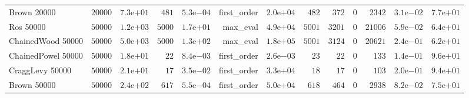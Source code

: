 \begin{longtable}[c]{lrrrrrrrrrrrr}
Brown 20000 & \(20000\) & \( 7.3\)e\(+01\) & \(  481\) & \( 5.3\)e\(-04\) & first\_order & \( 2.0\)e\(+04\) & \(  482\) & \(  372\) & \(    0\) & \( 2342\) & \( 3.1\)e\(-02\) & \( 7.7\)e\(+01\) \\
Ros 50000 & \(50000\) & \( 1.2\)e\(+03\) & \( 5000\) & \( 1.7\)e\(+01\) & max\_eval & \( 4.9\)e\(+04\) & \( 5001\) & \( 3201\) & \(    0\) & \(21006\) & \( 5.9\)e\(-02\) & \( 6.4\)e\(+01\) \\
ChainedWood 50000 & \(50000\) & \( 5.0\)e\(+03\) & \( 5000\) & \( 1.3\)e\(+02\) & max\_eval & \( 1.8\)e\(+05\) & \( 5001\) & \( 3124\) & \(    0\) & \(20621\) & \( 2.4\)e\(-01\) & \( 6.2\)e\(+01\) \\
ChainedPowel 50000 & \(50000\) & \( 1.8\)e\(+01\) & \(   22\) & \( 8.4\)e\(-03\) & first\_order & \( 2.6\)e\(-03\) & \(   23\) & \(   22\) & \(    0\) & \(  133\) & \( 1.4\)e\(-01\) & \( 9.6\)e\(+01\) \\
CraggLevy 50000 & \(50000\) & \( 2.1\)e\(+01\) & \(   17\) & \( 3.5\)e\(-02\) & first\_order & \( 3.3\)e\(+04\) & \(   18\) & \(   17\) & \(    0\) & \(  103\) & \( 2.0\)e\(-01\) & \( 9.4\)e\(+01\) \\
Brown 50000 & \(50000\) & \( 2.4\)e\(+02\) & \(  617\) & \( 5.5\)e\(-04\) & first\_order & \( 5.0\)e\(+04\) & \(  618\) & \(  464\) & \(    0\) & \( 2938\) & \( 8.2\)e\(-02\) & \( 7.5\)e\(+01\) \\
\hline 
\end{longtable}



